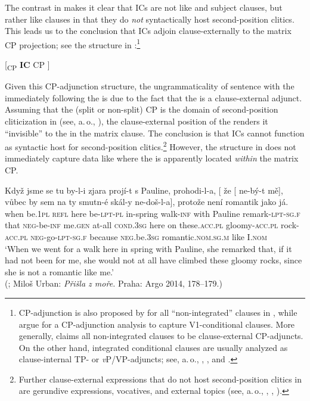 \documentclass[output=paper,colorlinks,citecolor=brown,newtxmath]{langsci/langscibook}
\begin{document}
\noindent The contrast in  makes it clear that ICs are not like  and subject clauses, but rather like  clauses in that they do \textit{not} syntactically host second-position clitics. This leads us to the conclusion that ICs adjoin clause-externally to the matrix CP projection; see the structure in :\footnote{CP-adjunction is also proposed by \citet[138]{Reis1997} for all ``non-integrated''  clauses in , while \citet[167\,ff]{ReisWoellstein2010} argue for a CP-adjunction analysis to capture  V1-conditional clauses. More generally, \citet[71]{Haegeman2004} claims all non-integrated  clauses to be clause-external CP-adjuncts. On the other hand, integrated conditional clauses are usually analyzed as clause-internal TP- or \textit{v}P/VP-adjuncts; see, a.\,o., \citet[138]{Reis1997}, \citet[144--145,\,168]{ReisWoellstein2010}, and \citet[647]{BhattPancheva2006}.}

\ea\label{tree:CPadjunction}
{[\textsubscript{CP} \textbf{IC} CP ]}
\z

\noindent Given this CP-adjunction structure, the ungrammaticality of sentence  with the  immediately following the  is due to the fact that the  is a clause-external adjunct. Assuming that the (split or non-split) CP is the domain of second-position cliticization in  (see, a.\,o., \citealt{Junghanns2002,Lenertova2004}), the clause-external position of the  renders it ``invisible'' to the  in the matrix clause. The conclusion is that ICs cannot function as syntactic host for second-position clitics.\footnote{Further clause-external expressions that do not host second-position clitics in  are gerundive expressions, vocatives, and external topics (see, a.\,o., \citealt{Dokulil1956}, \citealt{Travnicek1959}, \citealt[130--131]{Junghanns2002}).}
However, the structure in  does not immediately capture data like  where the  is apparently located \textit{within} the matrix CP.

\ea\label{ex:Pauline}
\gll Když jsme se tu by-l-i zjara projí-t s Pauline, prohodi-l-a, [\hspace{-2pt} že [\hspace{-2pt} ne-bý-t mě], vůbec by sem na ty smutn-é skál-y ne-doš-l-a], protože není romantik jako já.\\
	when be.\textsc{1pl} \textsc{refl} here be-\textsc{lpt-pl} {in-spring} walk-\textsc{inf} with Pauline remark-\textsc{lpt-sg.f} {} that {} \textsc{neg}-be-\textsc{inf} me.\textsc{gen} {at-all} \textsc{cond.3sg} here on these.\textsc{acc.pl} gloomy-\textsc{acc.pl} rock-\textsc{acc.pl} \textsc{neg}-go-\textsc{lpt-sg.f} because \textsc{neg}.be.\textsc{3sg} romantic.\textsc{nom.sg.m} like I.\textsc{nom}\\
\glt `When we went for a walk here in spring with Pauline, she remarked that, if it had not been for me, she would not at all have climbed these gloomy rocks, since she is not a romantic like me.' \\ \hfill (; Miloš Urban: \textit{Přišla z moře.} Praha: Argo 2014, 178--179.)
\z
\end{document}
